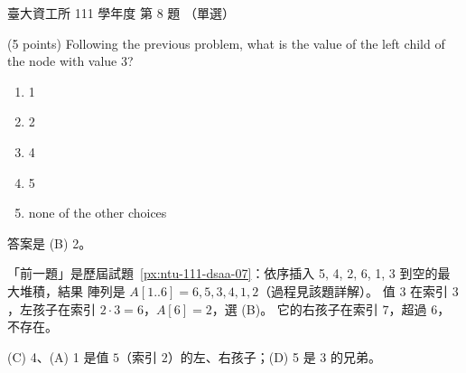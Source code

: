 \begin{pastexam}[label={px:ntu-111-dsaa-08}]{臺大資工所 111 學年度 第 8 題}
（單選）

(5 points) Following the previous problem, what is the value of the left child of the node with
value 3?
\begin{enumerate}[label=(\Alph*)]
\item 1
\item 2
\item 4
\item 5
\item none of the other choices
\end{enumerate}
\end{pastexam}

\begin{pastsoln}
答案是 (B) 2。

「前一題」是歷屆試題~\ref{px:ntu-111-dsaa-07}：依序插入 5, 4, 2, 6, 1, 3 到空的最大堆積，結果
陣列是 $A[1..6] = 6, 5, 3, 4, 1, 2$（過程見該題詳解）。 值 $3$ 在索引 $3$，左孩子在索引
$2 \cdot 3 = 6$，$A[6] = 2$，選 (B)。 它的右孩子在索引 $7$，超過 $6$，不存在。

(C) 4、(A) 1 是值 $5$（索引 $2$）的左、右孩子；(D) 5 是 $3$ 的兄弟。
\end{pastsoln}
